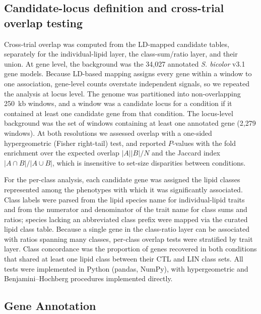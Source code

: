 \documentclass[9pt,twocolumn,twoside]{rilabRxiv}
\begin{document}
\subsection*{Candidate-locus definition and cross-trial overlap testing}

Cross-trial overlap was computed from the LD-mapped candidate tables, separately for the individual-lipid layer, the class-sum/ratio layer, and their union. At gene level, the background was the 34{,}027 annotated \textit{S. bicolor} v3.1 gene models. Because LD-based mapping assigns every gene within a window to one association, gene-level counts overstate independent signals, so we repeated the analysis at locus level. The genome was partitioned into non-overlapping 250~kb windows, and a window was a candidate locus for a condition if it contained at least one candidate gene from that condition. The locus-level background was the set of windows containing at least one annotated gene (2{,}279 windows). At both resolutions we assessed overlap with a one-sided hypergeometric (Fisher right-tail) test, and reported $P$-values with the fold enrichment over the expected overlap $|A||B|/N$ and the Jaccard index $|A\cap B|/|A\cup B|$, which is insensitive to set-size disparities between conditions.

For the per-class analysis, each candidate gene was assigned the lipid classes represented among the phenotypes with which it was significantly associated. Class labels were parsed from the lipid species name for individual-lipid traits and from the numerator and denominator of the trait name for class sums and ratios; species lacking an abbreviated class prefix were mapped via the curated lipid class table. Because a single gene in the class-ratio layer can be associated with ratios spanning many classes, per-class overlap tests were stratified by trait layer. Class concordance was the proportion of genes recovered in both conditions that shared at least one lipid class between their CTL and LIN class sets. All tests were implemented in Python (pandas, NumPy), with hypergeometric and Benjamini--Hochberg procedures implemented directly.

\subsection*{Gene Annotation}
\end{document}
